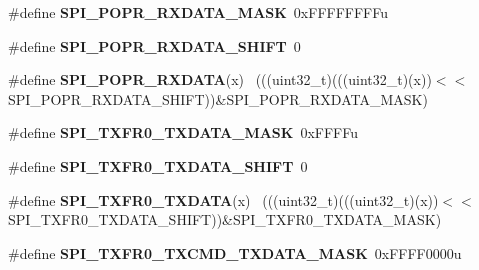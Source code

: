 \begin{DoxyCompactItemize}
\item 
\hypertarget{group___s_p_i___register___masks_ga3d2d3998529fd7de17cac99d625fe004}{}\#define {\bfseries S\+P\+I\+\_\+\+P\+O\+P\+R\+\_\+\+R\+X\+D\+A\+T\+A\+\_\+\+M\+A\+S\+K}~0x\+F\+F\+F\+F\+F\+F\+F\+Fu\label{group___s_p_i___register___masks_ga3d2d3998529fd7de17cac99d625fe004}

\item 
\hypertarget{group___s_p_i___register___masks_ga862819a722e0ccbd3f03edce9b82e5c2}{}\#define {\bfseries S\+P\+I\+\_\+\+P\+O\+P\+R\+\_\+\+R\+X\+D\+A\+T\+A\+\_\+\+S\+H\+I\+F\+T}~0\label{group___s_p_i___register___masks_ga862819a722e0ccbd3f03edce9b82e5c2}

\item 
\hypertarget{group___s_p_i___register___masks_ga2db032374de6c0b438ace671578d6464}{}\#define {\bfseries S\+P\+I\+\_\+\+P\+O\+P\+R\+\_\+\+R\+X\+D\+A\+T\+A}(x)                                          ~(((uint32\+\_\+t)(((uint32\+\_\+t)(x))$<$$<$S\+P\+I\+\_\+\+P\+O\+P\+R\+\_\+\+R\+X\+D\+A\+T\+A\+\_\+\+S\+H\+I\+F\+T))\&S\+P\+I\+\_\+\+P\+O\+P\+R\+\_\+\+R\+X\+D\+A\+T\+A\+\_\+\+M\+A\+S\+K)\label{group___s_p_i___register___masks_ga2db032374de6c0b438ace671578d6464}

\item 
\hypertarget{group___s_p_i___register___masks_ga9a231481c0385058731013344776a9f1}{}\#define {\bfseries S\+P\+I\+\_\+\+T\+X\+F\+R0\+\_\+\+T\+X\+D\+A\+T\+A\+\_\+\+M\+A\+S\+K}~0x\+F\+F\+F\+Fu\label{group___s_p_i___register___masks_ga9a231481c0385058731013344776a9f1}

\item 
\hypertarget{group___s_p_i___register___masks_ga8f072c39e4ee2cddff2444298fc92be0}{}\#define {\bfseries S\+P\+I\+\_\+\+T\+X\+F\+R0\+\_\+\+T\+X\+D\+A\+T\+A\+\_\+\+S\+H\+I\+F\+T}~0\label{group___s_p_i___register___masks_ga8f072c39e4ee2cddff2444298fc92be0}

\item 
\hypertarget{group___s_p_i___register___masks_gadc339b99a4f296761878521036b785df}{}\#define {\bfseries S\+P\+I\+\_\+\+T\+X\+F\+R0\+\_\+\+T\+X\+D\+A\+T\+A}(x)                                        ~(((uint32\+\_\+t)(((uint32\+\_\+t)(x))$<$$<$S\+P\+I\+\_\+\+T\+X\+F\+R0\+\_\+\+T\+X\+D\+A\+T\+A\+\_\+\+S\+H\+I\+F\+T))\&S\+P\+I\+\_\+\+T\+X\+F\+R0\+\_\+\+T\+X\+D\+A\+T\+A\+\_\+\+M\+A\+S\+K)\label{group___s_p_i___register___masks_gadc339b99a4f296761878521036b785df}

\item 
\hypertarget{group___s_p_i___register___masks_ga2d7e46a45e284b2a837f0dfa4103c9cc}{}\#define {\bfseries S\+P\+I\+\_\+\+T\+X\+F\+R0\+\_\+\+T\+X\+C\+M\+D\+\_\+\+T\+X\+D\+A\+T\+A\+\_\+\+M\+A\+S\+K}~0x\+F\+F\+F\+F0000u\label{group___s_p_i___register___masks_ga2d7e46a45e284b2a837f0dfa4103c9cc}


\end{DoxyCompactItemize}
